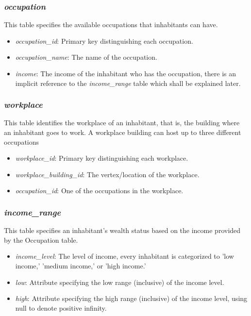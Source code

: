\documentclass{article}
\begin{document}
\subsubsection{\textit{occupation}}
This table specifies the available occupations that inhabitants can have.

\begin{itemize}
    \item \textit{occupation\_id}: Primary key distinguishing each occupation.
    \item \textit{occupation\_name}: The name of the occupation.
    \item \textit{income}: The income of the inhabitant who has the occupation, there is an implicit reference to the \textit{income\_range} table which shall be explained later.
\end{itemize}

\subsubsection{\textit{workplace}}
This table identifies the workplace of an inhabitant, that is, the building where an inhabitant goes to work. A workplace building can host up to three different occupations

\begin{itemize}
    \item \textit{workplace\_id}: Primary key distinguishing each workplace.
    \item \textit{workplace\_building\_id}: The vertex/location of the workplace.
    \item \textit{occupation\_id}: One of the occupations in the workplace.
\end{itemize}

\subsubsection{\textit{income\_range}}
This table specifies an inhabitant's wealth status based on the income provided by the Occupation table.

\begin{itemize}
    \item \textit{income\_level}: The level of income, every inhabitant is categorized to 'low income,' 'medium income,' or 'high income.'
    \item \textit{low}: Attribute specifying the low range (inclusive) of the income level.
    \item \textit{high}: Attribute specifying the high range (inclusive) of the income level, using null to denote positive infinity.
\end{itemize}
\end{document}
